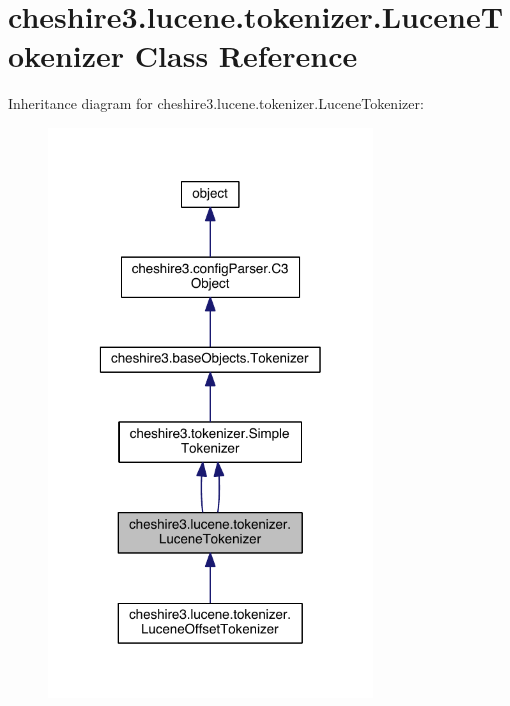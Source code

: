 \hypertarget{classcheshire3_1_1lucene_1_1tokenizer_1_1_lucene_tokenizer}{\section{cheshire3.\-lucene.\-tokenizer.\-Lucene\-Tokenizer Class Reference}
\label{classcheshire3_1_1lucene_1_1tokenizer_1_1_lucene_tokenizer}
}


Inheritance diagram for cheshire3.\-lucene.\-tokenizer.\-Lucene\-Tokenizer\-:
\nopagebreak
\begin{figure}[H]
\begin{center}
\leavevmode
\includegraphics[width=244pt]{classcheshire3_1_1lucene_1_1tokenizer_1_1_lucene_tokenizer__inherit__graph}
\end{center}
\end{figure}


